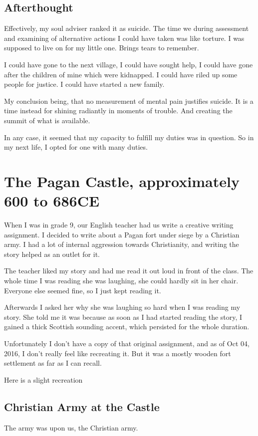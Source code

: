 \section{Afterthought}

Effectively, my soul adviser ranked it as suicide. The time we during assessment
and examining of alternative actions I could have taken was like torture. 
I was supposed to live on for my little one. Brings tears to remember.

I could have gone to the next village, I could have sought help, I could have
gone after the children of mine which were kidnapped. I could have riled up some
people for justice. I could have started a new family.

My conclusion being, that no measurement of mental pain justifies suicide. It
is a time instead for shining radiantly in moments of trouble. And creating the
summit of what is available. 

In any case, it seemed that my capacity to fulfill my duties was in question. So
in my next life, I opted for one with many duties.

\chapter{The Pagan Castle, approximately 600 to 686CE}\label{reincarnation:arwald}
When I was in grade 9, our English teacher had us write a creative writing
assignment. I decided to write about a Pagan fort under siege by a Christian
army.  I had a lot of internal aggression towards Christianity, and writing the
story helped as an outlet for it. 

The teacher liked my story and had me read it out loud in front of the class.
The whole time I was reading she was laughing, she could hardly sit in her
chair. Everyone else seemed fine, so I just kept reading it. 

Afterwards I asked her why she was laughing so hard when I was reading my story. 
She told me it was because as soon as I had started reading the story, I gained
a thick Scottish sounding accent, which persisted for the whole duration. 

Unfortunately I don't have a copy of that original assignment, and as of Oct
04, 2016, I don't really feel like recreating it. But it was a mostly wooden 
fort settlement as far as I can recall. 

Here is a slight recreation

\section{Christian Army at the Castle}
The army was upon us, the Christian army.

